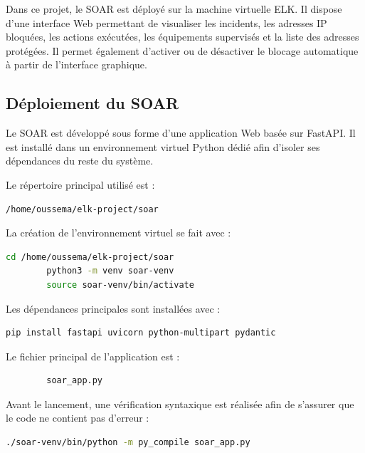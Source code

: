 \documentclass[12pt,a4paper,oneside]{report}
\begin{document}
    Dans ce projet, le SOAR est déployé sur la machine virtuelle ELK. Il dispose d'une interface Web permettant de visualiser les incidents, les adresses IP bloquées, les actions exécutées, les équipements supervisés et la liste des adresses protégées. Il permet également d'activer ou de désactiver le blocage automatique à partir de l'interface graphique.
    
    \subsection{Déploiement du SOAR}
    
    Le SOAR est développé sous forme d'une application Web basée sur FastAPI. Il est installé dans un environnement virtuel Python dédié afin d'isoler ses dépendances du reste du système.
    
    Le répertoire principal utilisé est :
    
    \begin{lstlisting}[language=bash]
    	/home/oussema/elk-project/soar
    \end{lstlisting}
    
    La création de l'environnement virtuel se fait avec :
    
    \begin{lstlisting}[language=bash]
    	cd /home/oussema/elk-project/soar
    	python3 -m venv soar-venv
    	source soar-venv/bin/activate
    \end{lstlisting}
    
    Les dépendances principales sont installées avec :
    
    \begin{lstlisting}[language=bash]
    	pip install fastapi uvicorn python-multipart pydantic
    \end{lstlisting}
    
    Le fichier principal de l'application est :
    
    \begin{lstlisting}
    	soar_app.py
    \end{lstlisting}
    
    Avant le lancement, une vérification syntaxique est réalisée afin de s'assurer que le code ne contient pas d'erreur :
    
    \begin{lstlisting}[language=bash]
    	./soar-venv/bin/python -m py_compile soar_app.py
    \end{lstlisting}
    
\end{document}
